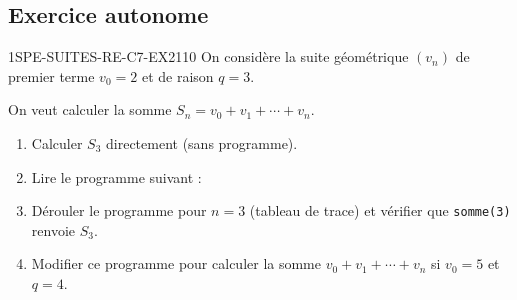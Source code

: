 \subsection*{Exercice autonome}


\begin{exercice}{1SPE-SUITES-RE-C7-EX2}{1}{10}
On considère la suite géométrique $(v_n)$ de premier terme $v_0 = 2$ et de raison $q = 3$.

On veut calculer la somme $S_n = v_0 + v_1 + \cdots + v_n$.

\begin{enumerate}
  \item Calculer $S_3$ directement (sans programme).
  \item Lire le programme suivant :

\medskip


  \item Dérouler le programme pour $n = 3$ (tableau de trace) et vérifier que \texttt{somme(3)} renvoie $S_3$.
  \item Modifier ce programme pour calculer la somme $v_0 + v_1 + \cdots + v_n$ si $v_0 = 5$ et $q = 4$.
\end{enumerate}
\end{exercice}


